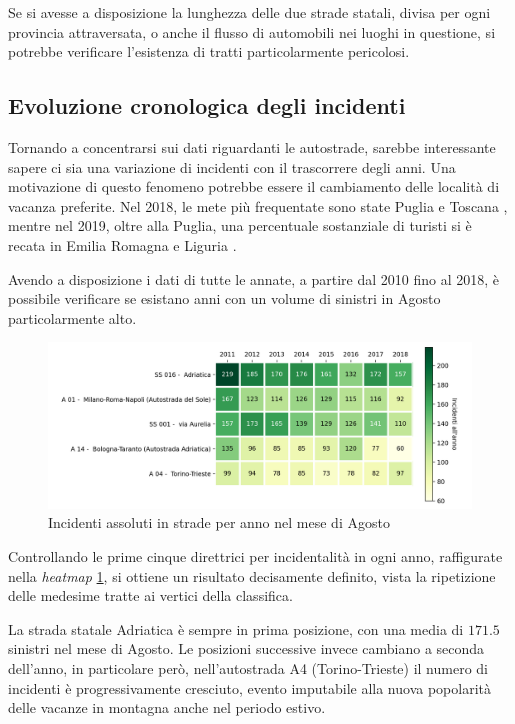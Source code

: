 \documentclass[a4paper]{report}
\newcommand{\quotestyle}[1]{\textit{#1}}
\begin{document}
Se si avesse a disposizione la lunghezza delle due strade statali, 
divisa per ogni provincia attraversata,
o anche il flusso di automobili nei luoghi in questione, 
si potrebbe verificare l'esistenza di tratti particolarmente pericolosi. 


\subsection{Evoluzione cronologica degli incidenti}

Tornando a concentrarsi sui dati riguardanti le autostrade, 
sarebbe interessante sapere ci sia una variazione di incidenti con il trascorrere degli anni. 
Una motivazione di questo fenomeno potrebbe essere il cambiamento 
delle località di vacanza preferite. 
Nel 2018, le mete più frequentate sono state Puglia e 
Toscana \cite{INFOGRAFICA_ISTAT:1}, mentre nel 2019, oltre alla Puglia, 
una percentuale sostanziale di turisti si è recata in 
Emilia Romagna e Liguria \cite{REPORT_ISTAT_2019:1}. 

Avendo a disposizione i dati di tutte le annate, a partire dal 2010 fino al 2018, 
è possibile verificare se esistano anni con un volume di 
sinistri in Agosto particolarmente alto. 

\begin{figure}
    \includegraphics[width=\linewidth]{../src/incidenti/incidenti_aci/agosto/vacanze_autostrade.png}
    \caption{Incidenti assoluti in strade per anno nel mese di Agosto}
    \label{fig:autostrade-anno}
\end{figure}

Controllando le prime cinque direttrici per incidentalità in ogni anno, 
raffigurate nella \quotestyle{heatmap} \ref{fig:autostrade-anno}, si ottiene 
un risultato decisamente definito, vista la ripetizione delle medesime 
tratte ai vertici della classifica.

La strada statale Adriatica è sempre in prima posizione, con una media di $171.5$ 
sinistri nel mese di Agosto. 
Le posizioni successive invece cambiano a seconda dell'anno, in particolare però, 
nell'autostrada A4 (Torino-Trieste) il numero di incidenti è progressivamente cresciuto, 
evento imputabile alla nuova popolarità delle vacanze in montagna anche nel periodo estivo. 
\end{document}
